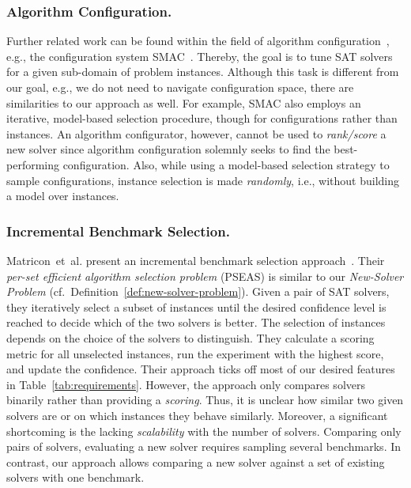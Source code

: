 \documentclass[runningheads]{llncs}
\begin{document}
\subsubsection{Algorithm Configuration.}

Further related work can be found within the field of algorithm configuration~\cite{HoosHL21,Stutzle0P22}, e.g., the configuration system SMAC~\cite{HutterHL11}.
Thereby, the goal is to tune SAT solvers for a given sub-domain of problem instances.
Although this task is different from our goal, e.g., we do not need to navigate configuration space, there are similarities to our approach as well.
For example, SMAC also employs an iterative, model-based selection procedure, though for configurations rather than instances.
An algorithm configurator, however, cannot be used to \emph{rank/score} a new solver since algorithm configuration solemnly seeks to find the best-performing configuration.
Also, while using a model-based selection strategy to sample configurations, instance selection is made \emph{randomly}, i.e., without building a model over instances.

\subsubsection{Incremental Benchmark Selection.}

Matricon~et~al. present an incremental benchmark selection approach~\cite{MatriconAFSH21}.
Their \emph{per-set efficient algorithm selection problem} (PSEAS) is similar to our \emph{New-Solver Problem} (cf.~Definition~\ref{def:new-solver-problem}).
Given a pair of SAT solvers, they iteratively select a subset of instances until the desired confidence level is reached to decide which of the two solvers is better.
The selection of instances depends on the choice of the solvers to distinguish.
They calculate a scoring metric for all unselected instances, run the experiment with the highest score, and update the confidence.
Their approach ticks off most of our desired features in Table~\ref{tab:requirements}.
However, the approach only compares solvers binarily rather than providing a \emph{scoring}.
Thus, it is unclear how similar two given solvers are or on which instances they behave similarly.
Moreover, a significant shortcoming is the lacking \emph{scalability} with the number of solvers.
Comparing only pairs of solvers, evaluating a new solver requires sampling several benchmarks.
In contrast, our approach allows comparing a new solver against a set of existing solvers with one benchmark.
\end{document}
